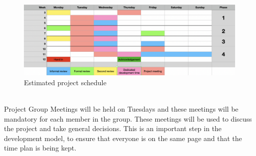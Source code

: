 \documentclass{article}
\begin{document}
    \begin{figure}[h]
        \centering
        \includegraphics[width=\textwidth]{images/schedule.png}
        \caption{Estimated project schedule}
        \label{schedule}
    \end{figure}
    \noindent
    \\
    Project Group Meetings will be held on Tuesdays and these meetings will be mandatory for each member in the group.
    These meetings will be used to discuss the project and take general decisions. This is an important step in the development model, to ensure that everyone is on the same page and that the time plan is being kept.
    
\end{document}
